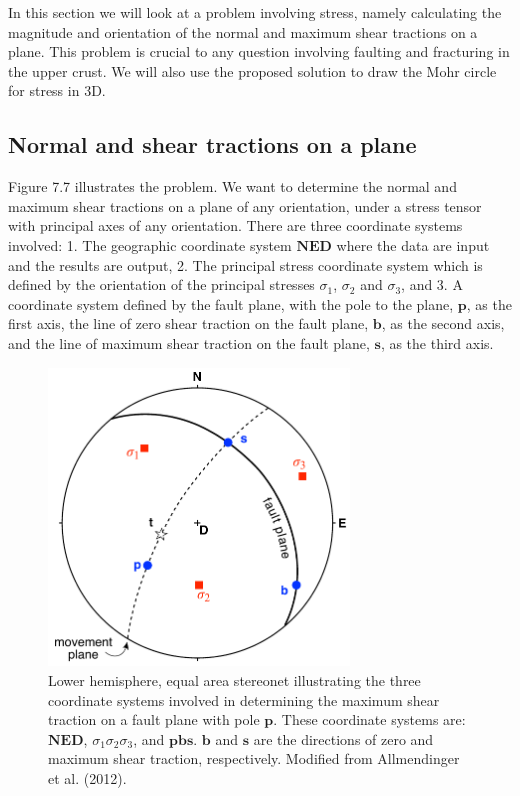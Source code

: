 \documentclass[a4paper , 12pt]{book}
\begin{document}
In this section we will look at a problem involving stress, namely calculating the magnitude and orientation of the normal and maximum shear tractions on a plane. This problem is crucial to any question involving faulting and fracturing in the upper crust. We will also use the proposed solution to draw the Mohr circle for stress in 3D.

\subsection{Normal and shear tractions on a plane}\label{shearOnPlane}

Figure 7.7 illustrates the problem. We want to determine the normal and maximum shear tractions on a plane of any orientation, under a stress tensor with principal axes of any orientation. There are three coordinate systems involved: 1. The geographic coordinate system $\mathbf{NED}$ where the data are input and the results are output, 2. The principal stress coordinate system which is defined by the orientation of the principal stresses $\sigma_1$, $\sigma_2$ and $\sigma_3$, and 3. A coordinate system defined by the fault plane, with the pole to the plane, $\mathbf{p}$, as the first axis, the line of zero shear traction on the fault plane, $\mathbf{b}$, as the second axis, and the line of maximum shear traction on the fault plane, $\mathbf{s}$, as the third axis.

\begin{figure}[ht]
    \centering
    \includegraphics[width=8cm]{ch7f7.pdf}
    \caption{Lower hemisphere, equal area stereonet illustrating the three coordinate systems involved in determining the maximum shear traction on a fault plane with pole $\mathbf{p}$. These coordinate systems are: $\mathbf{NED}$, $\sigma_1\sigma_2\sigma_3$, and $\mathbf{pbs}$. $\mathbf{b}$ and $\mathbf{s}$ are the directions of zero and maximum shear traction, respectively. Modified from Allmendinger et al. (2012).} 
\end{figure}
\end{document}

